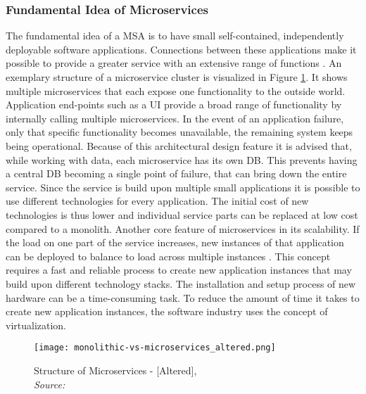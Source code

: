 \documentclass[12pt, a4paper]{article}
\begin{document}
        \subsubsection{Fundamental Idea of Microservices}\label{sssec::micro}
        The fundamental idea of a \ac{MSA} is to have small self-contained, independently deployable software applications. Connections between these applications make it possible to provide a greater service with an extensive range of functions \cite{micro}. An exemplary structure of a microservice cluster is visualized in Figure \ref{fig::micro}. It shows multiple microservices that each expose one functionality to the outside world. Application end-points such as a \ac{UI} provide a broad range of functionality by internally calling multiple microservices. In the event of an application failure, only that specific functionality becomes unavailable, the remaining system keeps being operational. Because of this architectural design feature it is advised that, while working with data, each microservice has its own \ac{DB}. This prevents having a central \acl{DB} becoming a single point of failure, that can bring down the entire service. Since the service is build upon multiple small applications it is possible to use different technologies for every application. The initial cost of new technologies is thus lower and individual service parts can be replaced at low cost compared to a monolith. Another core feature of microservices in its scalability. If the load on one part of the service increases, new instances of that application can be deployed to balance to load across multiple instances \cite{micro}. This concept requires a fast and reliable process to create new application instances that may build upon different technology stacks.\newline
        The installation and setup process of new hardware can be a time-consuming task. To reduce the amount of time it takes to create new application instances, the software industry uses the concept of virtualization.

        \begin{figure}
            \centering
            \texttt{[image: monolithic-vs-microservices\_altered.png]}
            \caption{Structure of Microservices - [Altered], \\\textit{Source:~\cite{redhat_micro}}}\label{fig::micro}
        \end{figure}
\end{document}
